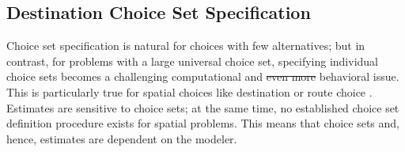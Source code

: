 \subsection{Destination Choice Set Specification}
Choice set specification is natural for choices with few alternatives; but in contrast, for problems with a large universal choice set, specifying individual choice sets becomes a challenging computational and \st{even more} behavioral issue.  This is particularly true for spatial choices like destination or route choice \citep[e.g.,][]{PagliaraTimmermans_TransLett_2009, Thill_PHG_1992, Schuessler_PhDThesis_2010, FrejingerEtAl_TransResB_2009}.
Estimates are sensitive to choice sets; at the same time, no established choice set definition procedure exists for spatial problems. 
This means that choice sets and, hence, estimates are 
dependent on the modeler.

